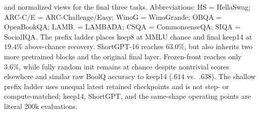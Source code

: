 \begin{table}[t]
{and normalized views for the final three tasks. Abbreviations: HS = HellaSwag;
ARC-C/E = ARC-Challenge/Easy; WinoG = WinoGrande; OBQA = OpenBookQA; LAMB. =
LAMBADA; CSQA = CommonsenseQA; SIQA = SocialIQA.
The prefix ladder places keep8 at MMLU chance and final keep14 at $19.4\%$
above-chance recovery. ShortGPT-16 reaches $63.0\%$, but also inherits two more
pretrained blocks and the original final layer. Frozen-front reaches only
$3.6\%$, while fully random init remains at chance despite nontrivial scores
elsewhere and similar raw BoolQ accuracy to keep14 ($.614$ vs.\ $.638$).
The shallow prefix ladder uses unequal latest retained checkpoints and is not
step- or compute-matched; keep14, ShortGPT, and the same-shape operating points are
literal 200k evaluations.}
\label{tab:downstream}
\end{table}
